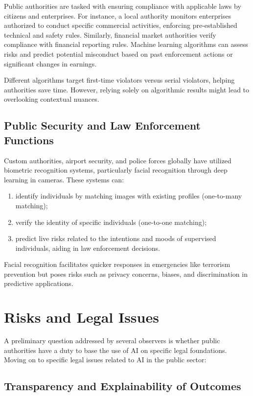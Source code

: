 Public authorities are tasked with ensuring compliance with applicable laws by citizens and enterprises. For instance, a local authority monitors enterprises authorized to conduct specific commercial activities, enforcing pre-established technical and safety rules. Similarly, financial market authorities verify compliance with financial reporting rules. Machine learning algorithms can assess risks and predict potential misconduct based on past enforcement actions or significant changes in earnings.

Different algorithms target first-time violators versus serial violators, helping authorities save time. However, relying solely on algorithmic results might lead to overlooking contextual nuances.

\subsection{Public Security and Law Enforcement Functions}

Custom authorities, airport security, and police forces globally have utilized biometric recognition systems, particularly facial recognition through deep learning in cameras. These systems can:

\begin{enumerate}[label=\roman*)]
    \item identify individuals by matching images with existing profiles (one-to-many matching);
    \item verify the identity of specific individuals (one-to-one matching);
    \item predict live risks related to the intentions and moods of supervised individuals, aiding in law enforcement decisions.
\end{enumerate}

Facial recognition facilitates quicker responses in emergencies like terrorism prevention but poses risks such as privacy concerns, biases, and discrimination in predictive applications.

\section{Risks and Legal Issues}

A preliminary question addressed by several observers is whether public authorities have a duty to base the use of AI on specific legal foundations. Moving on to specific legal issues related to AI in the public sector:

\subsection{Transparency and Explainability of Outcomes}

